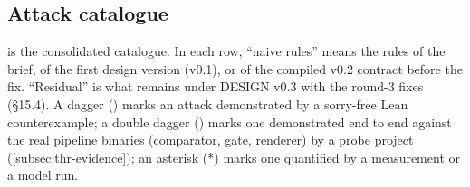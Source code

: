 \subsection{Attack catalogue}\label{subsec:thr-catalogue}

 is the consolidated catalogue. In each row, \enquote{naive rules} means the
rules of the brief, of the first design version (v0.1), or of the compiled v0.2 contract before the
fix. \enquote{Residual} is what remains under DESIGN v0.3 with the round-3 fixes (§15.4). A dagger
(\textdagger) marks an attack demonstrated by a sorry-free Lean counterexample; a double dagger
(\textdaggerdbl) marks one demonstrated end to end against the real pipeline binaries (comparator,
gate, renderer) by a probe project (\cref{subsec:thr-evidence}); an asterisk (*) marks one quantified
by a measurement or a model run.

